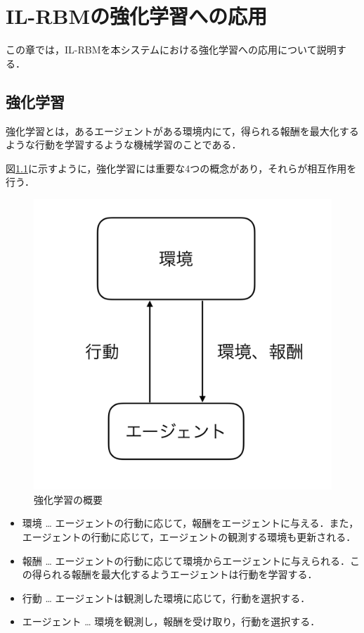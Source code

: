 \chapter{IL-RBMの強化学習への応用}\label{ch:ilrbm}
この章では，IL-RBMを本システムにおける強化学習への応用について説明する．


\section{強化学習}
強化学習\cite{RL木村}とは，あるエージェントがある環境内にて，得られる報酬を最大化するような行動を学習するような機械学習のことである．

図\ref{fig:el}に示すように，強化学習には重要な4つの概念があり，それらが相互作用を行う．

\begin{figure}[tb]
 \begin{center}
  \includegraphics[scale=0.4]{./koki/el.png}
  \caption{強化学習の概要}
  \label{fig:el}
 \end{center}
\end{figure}


\begin{itemize}
  \item 環境 … エージェントの行動に応じて，報酬をエージェントに与える．また，エージェントの行動に応じて，エージェントの観測する環境も更新される．
  \item 報酬 … エージェントの行動に応じて環境からエージェントに与えられる．この得られる報酬を最大化するようエージェントは行動を学習する．
  \item 行動  … エージェントは観測した環境に応じて，行動を選択する．
  \item エージェント … 環境を観測し，報酬を受け取り，行動を選択する．
\end{itemize}

